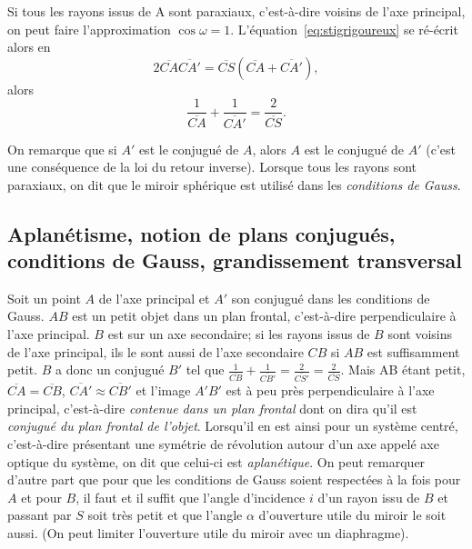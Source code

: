 Si tous les rayons issus de A sont paraxiaux, c'est-à-dire voisins de l'axe 
principal, on peut faire l'approximation \(\cos \omega = 1\).
L'équation~\ref{eq:stigrigoureux} se ré-écrit alors en
\begin{equation}%
  2 \overline{CA} \overline{CA'} = \overline{CS}(\overline{CA}+ 
  \overline{CA'}),
\end{equation}%
alors
\begin{equation}%
  \frac{1}{\overline{CA}} + \frac{1}{\overline{CA'}} = \frac{2}{\overline{CS}}.
\end{equation}%

On remarque que si \(A'\) est le conjugué de \(A\), alors \(A\) est le conjugué 
de \(A'\) (c'est une conséquence de la loi du retour inverse). Lorsque tous les 
rayons sont paraxiaux, on dit que le miroir sphérique est utilisé dans les 
\emph{conditions de Gauss}.

\subsection{Aplanétisme, notion de plans conjugués, conditions de Gauss, 
grandissement transversal}%
\label{chap7-subsec:aplanetisme}%

Soit un point \(A\) de l'axe principal et \(A'\) son conjugué dans les 
conditions de Gauss. \(AB\) est un petit objet dans un plan frontal, 
c'est-à-dire perpendiculaire à l'axe principal. \(B\) est sur un axe 
secondaire; si les rayons issus de \(B\) sont voisins de l'axe principal, ils 
le sont aussi de l'axe secondaire \(CB\) si \(AB\) est suffisamment petit. 
\(B\) a donc un conjugué \(B'\) tel que 
\(\frac{1}{\overline{CB}}+\frac{1}{\overline{CB'}} = \frac{2}{\overline{CS'}} = 
\frac{2}{\overline{CS}}\). Mais AB étant petit, 
\(\overline{CA}=\overline{CB}\), \(\overline{CA'} \approx \overline{CB'}\) et 
l'image \(A'B'\) est à peu près perpendiculaire à l'axe principal, c'est-à-dire 
\emph{contenue dans un plan frontal} dont on dira qu'il est \emph{conjugué du 
plan frontal de l'objet}.
Lorsqu'il en est ainsi pour un système centré, c'est-à-dire présentant une 
symétrie de révolution autour d'un axe appelé axe optique du système, on dit 
que celui-ci est \emph{aplanétique}.
On peut remarquer d'autre part que pour que les conditions de Gauss soient 
respectées à la fois pour \(A\) et pour \(B\), il faut et il suffit que l'angle 
d'incidence \(i\) d'un rayon issu de \(B\) et passant par \(S\) soit très petit 
et que l'angle \(\alpha\) d'ouverture utile du miroir le soit aussi. (On peut 
limiter l'ouverture utile du miroir avec un diaphragme).

